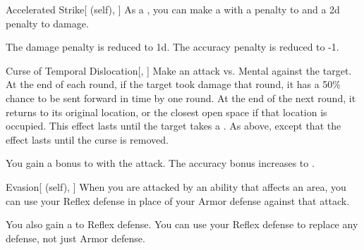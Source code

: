 \lowercase{\hypertarget{spell:Accelerated Strike}{}}\label{spell:Accelerated Strike}
\begin{attuneability}[Rank 4]{\hypertarget{spell:Accelerated Strike}{Accelerated Strike}}[ (self), ]
As a , you can make a  with a  penalty to  and a \minus2d penalty to damage.

\rankline
{} The damage penalty is reduced to \minus1d.
 The accuracy penalty is reduced to -1.

\end{attuneability}
\vspace{0.25em}



\lowercase{\hypertarget{spell:Curse of Temporal Dislocation}{}}\label{spell:Curse of Temporal Dislocation}
\begin{freeability}[Rank 4]{\hypertarget{spell:Curse of Temporal Dislocation}{Curse of Temporal Dislocation}}[, ]
Make an attack vs. Mental against the target.
\hit At the end of each round, if the target took damage that round, it has a 50\% chance to be sent forward in time by one round.
At the end of the next round, it returns to its original location, or the closest open space if that location is occupied.
This effect lasts until the target takes a .
\crit As above, except that the effect lasts until the curse is removed.

\rankline
{} You gain a  bonus to  with the attack.
 The accuracy bonus increases to .

\end{freeability}
\vspace{0.25em}



\lowercase{\hypertarget{spell:Evasion}{}}\label{spell:Evasion}
\begin{attuneability}[Rank 4]{\hypertarget{spell:Evasion}{Evasion}}[ (self), ]
When you are attacked by an ability that affects an area, you can use your Reflex defense in place of your Armor defense against that attack.

\rankline
{} You also gain a   to Reflex defense.
 You can use your Reflex defense to replace any defense, not just Armor defense.

\end{attuneability}
\vspace{0.25em}



